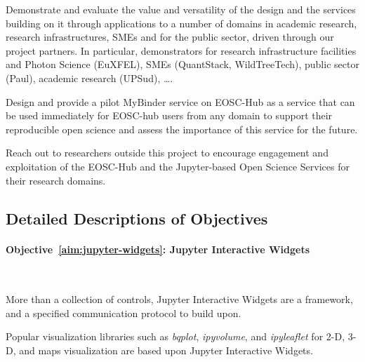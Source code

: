 \begin{compactenum}
\item \label{aim:demonstrators}%
  Demonstrate and evaluate the value and versatility of the design and
  the services building on it through applications to a number of
  domains in academic research, research infrastructures, SMEs and for
  the public sector, driven through our project partners. In
  particular, demonstrators for research infrastructure facilities and
  Photon Science (EuXFEL), SMEs (QuantStack, WildTreeTech), public
  sector (Paul), academic research (UPSud), \ldots.


\item \label{aim:binderservice}%
  Design and provide a pilot MyBinder service on EOSC-Hub as a service
  that can be used immediately for EOSC-hub users from any domain to
  support their reproducible open science and assess the importance of
  this service for the future.

\item \label{aim:outreach-and-engagement}%
  Reach out to researchers outside this project to encourage engagement
  and exploitation of the EOSC-Hub and the Jupyter-based Open Science
  Services for their research domains.


\end{compactenum}

\subsection*{Detailed Descriptions of Objectives}


\paragraph{Objective~\ref{aim:jupyter-widgets}: Jupyter Interactive Widgets}\

More than a collection of controls, Jupyter Interactive Widgets are a
framework, and a specified communication protocol to build upon.

Popular visualization libraries such as \emph{bqplot}, \emph{ipyvolume}, and
\emph{ipyleaflet} for 2-D, 3-D, and maps visualization are based upon Jupyter
Interactive Widgets.

